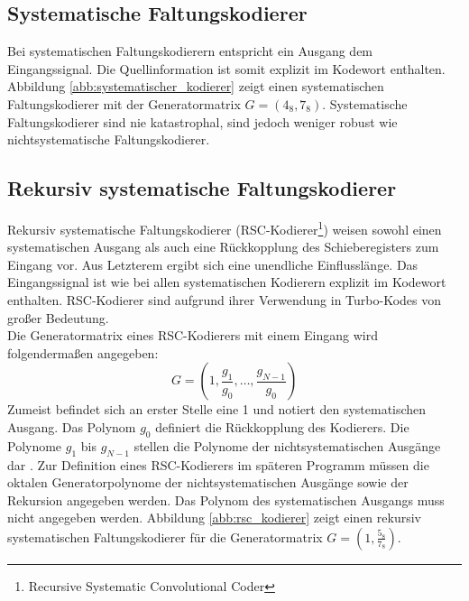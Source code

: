 \subsection{Systematische Faltungskodierer}
\label{kapitel:grundlagen_systematische_kodierer}
Bei systematischen Faltungskodierern entspricht ein Ausgang dem Eingangssignal. Die Quellinformation ist somit explizit im Kodewort enthalten. Abbildung \ref{abb:systematischer_kodierer} zeigt einen systematischen Faltungskodierer mit der Generatormatrix $G=\left( 4_{8},7_{8}\right)$. Systematische Faltungskodierer sind nie katastrophal, sind jedoch weniger robust wie nichtsystematische Faltungskodierer. \cite[S. 217]{schonfeld2012informations}

\subsection{Rekursiv systematische Faltungskodierer}
\label{kapitel:grundlagen_rsc}
Rekursiv systematische Faltungskodierer (RSC-Kodierer\footnote{Recursive Systematic Convolutional Coder}) weisen sowohl einen systematischen Ausgang als auch eine Rückkopplung des Schieberegisters zum Eingang vor. Aus Letzterem ergibt sich eine unendliche Einflusslänge. Das Eingangssignal ist wie bei allen systematischen Kodierern explizit im Kodewort enthalten. RSC-Kodierer sind aufgrund ihrer Verwendung in Turbo-Kodes von großer Bedeutung.
\\
Die Generatormatrix eines RSC-Kodierers mit einem Eingang wird folgendermaßen angegeben:
\begin{equation}
G=\left( 1, \frac{g_{1}}{g_{0}},\dots , \frac{g_{N-1}}{g_{0}} \right)
\end{equation}
Zumeist befindet sich an erster Stelle eine 1 und notiert den systematischen Ausgang. Das Polynom $g_{0}$ definiert die Rückkopplung des Kodierers. Die Polynome $g_{1}$ bis $g_{N-1}$ stellen die Polynome der nichtsystematischen Ausgänge dar \cite{morelos2006art}. Zur Definition eines RSC-Kodierers im späteren Programm müssen die oktalen Generatorpolynome der nichtsystematischen Ausgänge sowie der Rekursion angegeben werden. Das Polynom des systematischen Ausgangs muss nicht angegeben werden. Abbildung \ref{abb:rsc_kodierer} zeigt einen rekursiv systematischen Faltungskodierer für die Generatormatrix $G=\left( 1,\frac{5_{8}}{7_{8}}\right)$.

